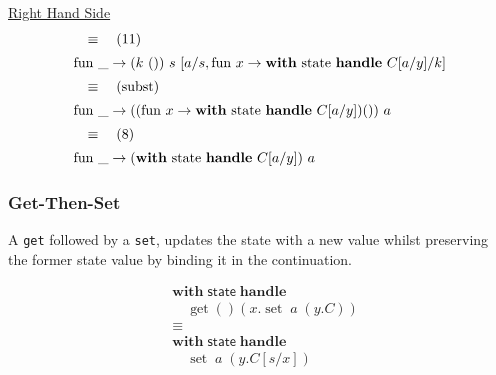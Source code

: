 \documentclass[logo,bsc,singlespacing,parskip]{infthesis}
\begin{document}
\underline{Right Hand Side}
\[ 
\begin{array}{l}
\quad\equiv\quad (11) \\[5pt]
\text{fun }\_ \rightarrow (k\ ())\ s\ [a/s, \text{fun } x \rightarrow \text{\textbf{with} state \textbf{handle} } C[a/y]/k] \\[5pt]
\quad\equiv\quad (\text{subst}) \\[5pt]
\text{fun }\_ \rightarrow ((\text{fun } x \rightarrow \text{\textbf{with} state \textbf{handle} } C[a/y]) ())\ a \\[5pt]
\quad\equiv\quad (8) \\[5pt]
\text{fun }\_ \rightarrow (\text{\textbf{with} state \textbf{handle} } C[a/y])\ a
\end{array}
\]



\subsubsection*{Get-Then-Set}
A \lstinline{get} followed by a \lstinline{set}, updates the state with a new value whilst preserving the former state value by binding it in the continuation. 


\[
\begin{aligned}
    &\mathsf{\textbf{with}} \; \mathsf{state} \; \mathsf{\textbf{handle}} \\
    &\quad \operatorname{get}() \left( x. \operatorname{set} \; a \; (y. C) \right) \\
    &\equiv \\
    &\mathsf{\textbf{with}} \; \mathsf{state} \; \mathsf{\textbf{handle}} \\
    &\quad \operatorname{set} \; a \; (y. C[s/x])
\end{aligned}
\]
\end{document}
